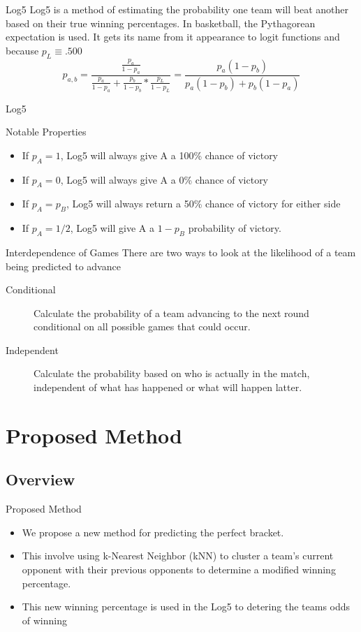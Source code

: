 \documentclass{beamer}
\begin{document}
\begin{frame}{Log5}
Log5 is a method of estimating the probability one team will beat another based on their true winning percentages. In basketball, the Pythagorean expectation is used. It gets its name from it appearance to logit functions and because $p_L \equiv .500$
\[
p_{a,b} = \frac{\frac{p_a}{1-p_a}}{\frac{p_a}{1-p_a} + \frac{p_b}{1-p_b} * \frac{p_L}{1-p_L}} = \frac{p_a (1 - p_b)}{p_a (1 - p_b) + p_b (1 - p_a)}
\]
\end{frame}

\begin{frame}{Log5}
\begin{block}{Notable Properties}
\begin{itemize}
\item If $p_A = 1$, Log5 will always give A a 100\% chance of victory
\item If $p_A = 0$, Log5 will always give A a 0\% chance of victory
\item If $p_A = p_B$, Log5 will always return a 50\% chance of victory for either side
\item If $p_A = 1/2$, Log5 will give A a $1-p_B$ probability of victory.
\end{itemize}
\end{block} 
\end{frame}

\begin{frame}{Interdependence of Games}
There are two ways to look at the likelihood of a team being predicted to advance
\begin{description}
\item[Conditional] Calculate the probability of a team advancing to the next round conditional on all possible games that could occur.
\item[Independent] Calculate the probability based on who is actually in the match, independent of what  has happened or what will happen latter.
\end{description}
\end{frame}



\section{Proposed Method}
\subsection{Overview}

\begin{frame}{Proposed Method}
\begin{itemize}
\item We propose a new method for predicting the perfect bracket.
\item This involve using k-Nearest Neighbor (kNN) to cluster a team's current opponent with their previous opponents to determine a modified winning percentage.
\item This new winning percentage is used in the Log5 to detering the teams odds of winning
\end{itemize}

\end{frame}
\end{document}
